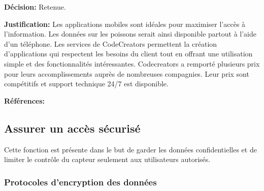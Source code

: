 \textbf{Décision:} Retenue.

\textbf{Justification:} Les applications mobiles sont idéales pour maximiser l'accès à l'information. Les données sur les poissons serait ainsi disponible partout à l'aide d'un téléphone. Les services de CodeCreators permettent la création d'applications qui respectent les besoins du client tout en offrant une utilisation simple et des fonctionnalités intéressantes. Codecreators a remporté plusieurs prix pour leurs accomplissements auprès de nombreuses compagnies. Leur prix sont compétitifs et support technique 24/7 est disponible.

\textbf{Références:} \cite{CodeCreators} \cite{CodeCreators2}

\begin{table}[!htb]
\footnotesize
\centering
{}
\caption{Évaluation globale des concepts pour afficher les données}
\label{t:Decision_affichage}
\end{table}


\subsection{Assurer un accès sécurisé}
Cette fonction est présente dans le but de garder les données confidentielles et de limiter le contrôle du capteur seulement aux utilisateurs autorisés. %


\subsubsection{Protocoles d’encryption des données}

